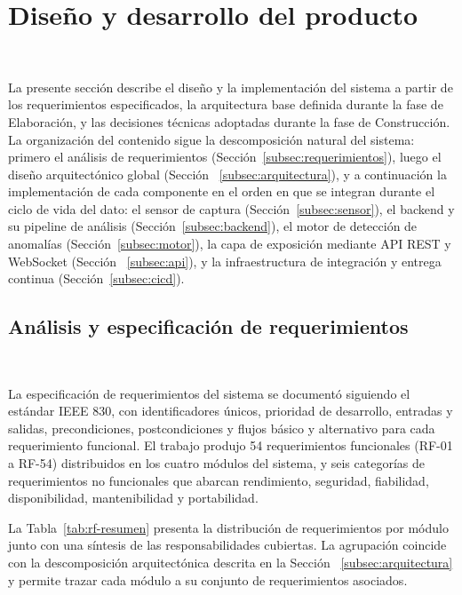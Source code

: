 \section{Diseño y desarrollo del producto}
~\label{sec:desarrollo}

La presente sección describe el diseño y la implementación del sistema 
a partir de los requerimientos especificados, la arquitectura base 
definida durante la fase de Elaboración, y las decisiones técnicas 
adoptadas durante la fase de Construcción. La organización del 
contenido sigue la descomposición natural del sistema: primero el 
análisis de requerimientos (Sección~\ref{subsec:requerimientos}), 
luego el diseño arquitectónico global (Sección 
~\ref{subsec:arquitectura}), y a continuación la implementación de 
cada componente en el orden en que se integran durante el ciclo de 
vida del dato: el sensor de captura (Sección~\ref{subsec:sensor}), el 
backend y su pipeline de análisis (Sección~\ref{subsec:backend}), el 
motor de detección de anomalías (Sección~\ref{subsec:motor}), la capa 
de exposición mediante API REST y WebSocket (Sección 
~\ref{subsec:api}), y la infraestructura de integración y entrega 
continua (Sección~\ref{subsec:cicd}).

\subsection{Análisis y especificación de requerimientos}
~\label{subsec:requerimientos}

La especificación de requerimientos del sistema se documentó 
siguiendo el estándar IEEE 830, con identificadores únicos, 
prioridad de desarrollo, entradas y salidas, precondiciones, 
postcondiciones y flujos básico y alternativo para cada requerimiento 
funcional. El trabajo produjo 54 requerimientos funcionales (RF-01 a 
RF-54) distribuidos en los cuatro módulos del sistema, y seis 
categorías de requerimientos no funcionales que abarcan rendimiento, 
seguridad, fiabilidad, disponibilidad, mantenibilidad y portabilidad.

La Tabla~\ref{tab:rf-resumen} presenta la distribución de 
requerimientos por módulo junto con una síntesis de las 
responsabilidades cubiertas. La agrupación coincide con la 
descomposición arquitectónica descrita en la Sección 
~\ref{subsec:arquitectura} y permite trazar cada módulo a su conjunto 
de requerimientos asociados.

